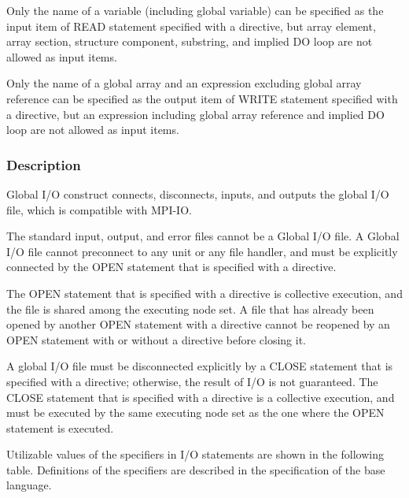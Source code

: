    Only the name of a variable (including global variable) can be specified 
   as the input item of READ statement specified with a \gio directive,
   but array element, array section,
   structure component, substring, and implied DO loop are not allowed as input items.

   Only the name of a global array
   and an expression excluding global array reference can be specified
   as the output item
   of WRITE statement specified with a \gio directive, 
   but an expression including global array
   reference and implied DO loop are not allowed as input items.
   \fi

   \subsubsection*{Description}

   Global I/O construct connects, disconnects, inputs, and outputs the
   global I/O file, which is compatible with MPI-IO.

   The standard input, output, and error files cannot be a Global I/O file.
   A Global I/O file cannot preconnect to any unit or any file handler,
   and must be explicitly connected by the OPEN statement that is
   specified with a \gio directive.

   The OPEN statement that is specified with a \gio directive is
   collective execution, and the file is shared among the executing node 
   set.
   A file that has already been opened by another OPEN statement with
   a \gio directive cannot be reopened by an OPEN statement with or
   without a \gio directive before closing it.

   A global I/O file must be disconnected explicitly by a CLOSE
   statement that is specified with a \gio directive; otherwise, the
   result of I/O is not guaranteed.
   The CLOSE statement that is specified with a \gio directive is a
   collective execution, and must be executed by the same executing 
   node set as the one where the OPEN statement is executed.

   Utilizable values of the specifiers in I/O statements are shown in the
   following table.
   Definitions of the specifiers are described in the specification of
   the base language.

